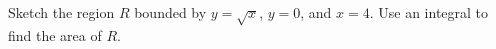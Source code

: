 Sketch the region $R$ bounded by $y=\sqrt{x}$, $y=0$, and $x=4$.  Use an integral to find the area of $R$.